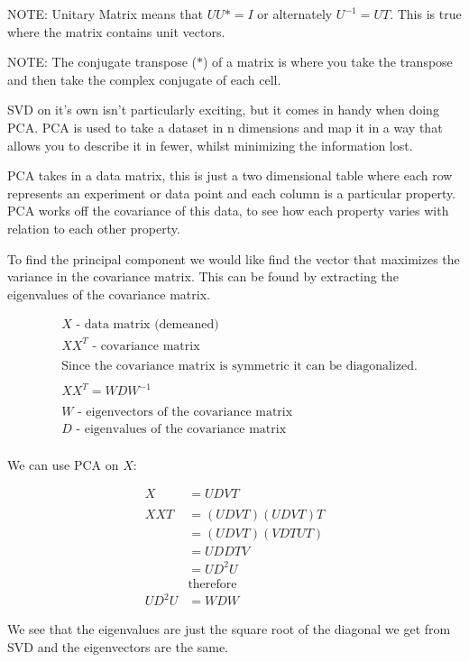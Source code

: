 NOTE: Unitary Matrix means that $UU* = I$ or alternately $U^{-1} = UT$. This is true where the matrix contains unit vectors.

NOTE: The conjugate transpose ($*$) of a matrix is where you take the transpose and then take the complex conjugate of each cell.

SVD on it’s own isn’t particularly exciting, but it comes in handy when doing PCA. PCA is used to take a dataset in n dimensions and map it in a way that allows you to describe it in fewer, whilst minimizing the information lost.

PCA takes in a data matrix, this is just a two dimensional table where each row represents an experiment or data point and each column is a particular property. PCA works off the covariance of this data, to see how each property varies with relation to each other property.

To find the principal component we would like find the vector that maximizes the variance in the covariance matrix. This can be found by extracting the eigenvalues of the covariance matrix.

\begin{align*}
& X \text{ - data matrix (demeaned)} \\
& XX^{T} \text{ - covariance matrix} \\
& \\
& \text{Since the covariance matrix is symmetric it can be diagonalized.} \\
& \\
& XX^{T} = WDW^{-1} \\
& \\
& W \text{ - eigenvectors of the covariance matrix} \\
& D \text{ - eigenvalues of the covariance matrix} \\
\end{align*}

We can use PCA on $X$:

\begin{align*}
X &= UDVT \\
& \\
XXT &= (UDVT)(UDVT)T \\
	&= (UDVT)(VDTUT) \\
	&= UDDTV \\
	&= UD^{2}U \\
	& \text{therefore} \\
UD^{2}U &= WDW
\end{align*}

We see that the eigenvalues are just the square root of the diagonal we get from SVD and the eigenvectors are the same.

